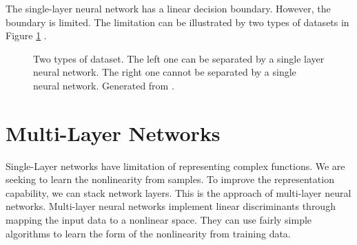 The single-layer neural network has a linear decision boundary. However, the boundary is limited. The limitation can be illustrated by two types of datasets in Figure \ref{fig:1Layer2datasets} .
\graphicspath{ {./Figures/} }
\begin{figure}[!htb]
\centering     %
{}
\caption{\label{fig:1Layer2datasets}Two types of dataset. The left one can be separated by a single layer neural network. The right one cannot be separated by a single neural network. Generated from \citep{GenerateNN}.}
\end{figure}

\section{Multi-Layer Networks}

Single-Layer networks have limitation of representing complex functions. We are seeking to learn the nonlinearity from samples. To improve the representation capability, we can stack network layers. This is the approach of multi-layer neural networks. Multi-layer neural networks implement linear discriminants through mapping the input data to a nonlinear space. They can use fairly simple algorithms to learn the form of the nonlinearity from training data.

